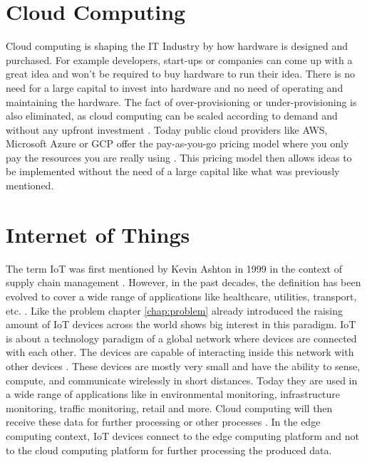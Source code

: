 \section{Cloud Computing}
Cloud computing is shaping the IT Industry by how hardware is designed and purchased. For example developers, start-ups or companies can come up with a great idea and won't be required to buy hardware to run their idea. There is no need for a large capital to invest into hardware and no need of operating and maintaining the hardware. The fact of over-provisioning or under-provisioning is also eliminated, as cloud computing can be scaled according to demand and without any upfront investment \cite{Armbrust2010}. Today public cloud providers like \gls{AWS}, Microsoft Azure or \gls{GCP} offer the pay-as-you-go pricing model where you only pay the resources you are really using \cite{AWSWhatComputing} \cite{MicrosoftWhatAzure} \cite{GoogleCloudCloud}. This pricing model then allows ideas to be implemented without the need of a large capital like what was previously mentioned.

\section{Internet of Things}
The term \gls{IoT} was first mentioned by Kevin Ashton in 1999 in the context of supply chain management \cite{ashton2009internet}. However, in the past decades, the definition has been evolved to cover a wide range of applications like healthcare, utilities, transport, etc. \cite{Lee2015}. Like the problem chapter \ref{chap:problem} already introduced the raising amount of \gls{IoT} devices across the world shows big interest in this paradigm. \gls{IoT} is about a technology paradigm of a global network where devices are connected with each other. The devices are capable of interacting inside this network with other devices \cite{Lee2015}. These devices are mostly very small and have the ability to sense, compute, and communicate wirelessly in short distances. Today they are used in a wide range of applications like in environmental monitoring, infrastructure monitoring, traffic monitoring, retail and more. Cloud computing will then receive these data for further processing or other processes \cite{Gubbi2013}. In the edge computing context, \gls{IoT} devices connect to the edge computing platform and not to the cloud computing platform for further processing the produced data.
